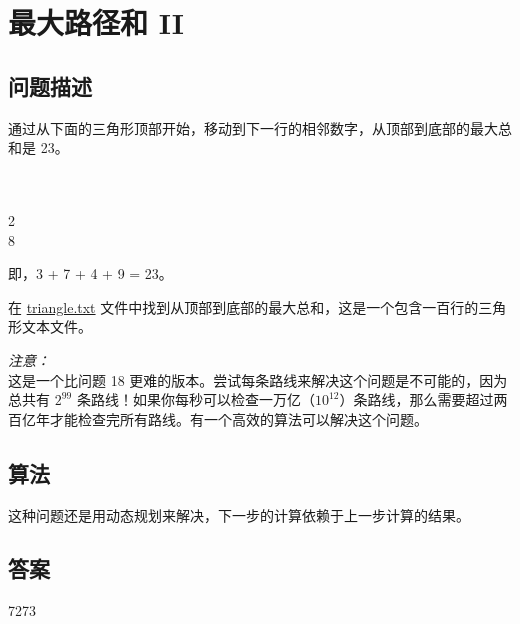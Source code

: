\section{最大路径和 II}
\subsection{问题描述}
\begin{tcolorbox}
	通过从下面的三角形顶部开始，移动到下一行的相邻数字，从顶部到底部的最大总和是 23。

	\begin{center}
		\\
		\\
		2\quad{}\\
		8\quad{}
	\end{center}

	即，3 + 7 + 4 + 9 = 23。

	在 \href{https://projecteuler.net/resources/documents/0067_triangle.txt}{triangle.txt} 文件中找到从顶部到底部的最大总和，这是一个包含一百行的三角形文本文件。

	\emph{注意：}\\这是一个比问题 18 更难的版本。尝试每条路线来解决这个问题是不可能的，因为总共有 $2^{99}$
	条路线！如果你每秒可以检查一万亿（$10^{12}$）条路线，那么需要超过两百亿年才能检查完所有路线。有一个高效的算法可以解决这个问题。
\end{tcolorbox}

\subsection{算法}
这种问题还是用动态规划来解决，下一步的计算依赖于上一步计算的结果。

\subsection{答案}
7273

